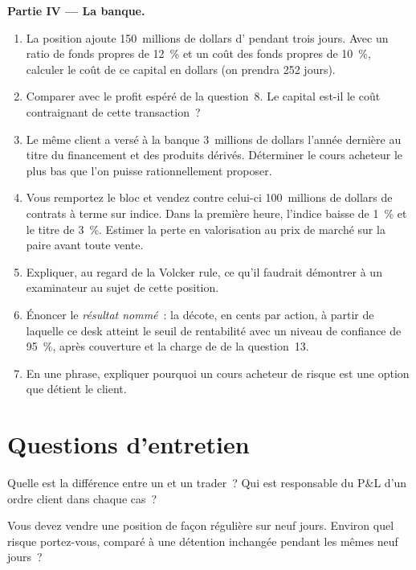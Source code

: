 \begin{problem}
\medskip\noindent\textbf{Partie IV --- La banque.}
\begin{enumerate}[resume]
\item La position ajoute 150~millions de dollars d' pendant trois jours. Avec un ratio de fonds propres de 12~\% et un
coût des fonds propres de 10~\%, calculer le coût de ce capital en dollars (on prendra 252 jours).
\item Comparer avec le profit espéré de la question~8. Le capital est-il
le coût contraignant de cette transaction~?
\item Le même client a versé à la banque 3~millions de dollars l'année dernière au titre
du financement et des produits dérivés. Déterminer le cours acheteur le plus bas que l'on puisse rationnellement proposer.
\item Vous remportez le bloc et vendez contre celui-ci 100~millions de dollars
de contrats à terme sur indice. Dans la première heure, l'indice baisse de 1~\% et le
titre de 3~\%. Estimer la perte en valorisation au prix de marché sur la paire avant toute vente.
\item Expliquer, au regard de la Volcker rule, ce qu'il faudrait démontrer
à un examinateur au sujet de cette position.
\item Énoncer le \emph{résultat nommé}~: la décote, en cents par action, à partir
de laquelle ce desk atteint le seuil de rentabilité avec un niveau de confiance de
95~\%, après couverture et la charge de  de la question~13.
\item En une phrase, expliquer pourquoi un cours acheteur de risque est une option que détient le client.
\end{enumerate}
\end{problem}

\section{Questions d'entretien}

\begin{interviewq}\label{iq:m1:the-sell-side:1}
Quelle est la différence entre un  et un trader~? Qui est
responsable du P\&L d'un ordre client dans chaque cas~?
\end{interviewq}

\begin{interviewq}\label{iq:m1:the-sell-side:2}
Vous devez vendre une position de façon régulière sur neuf jours. Environ quel
risque portez-vous, comparé à une détention inchangée pendant les mêmes neuf jours~?
\end{interviewq}

